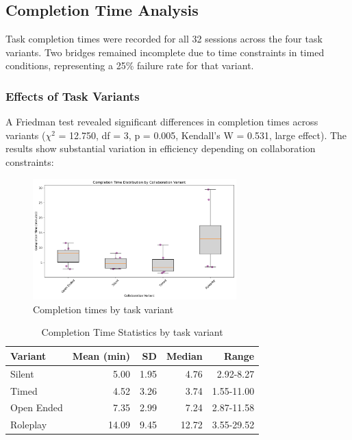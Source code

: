 \subsection{Completion Time Analysis}

Task completion times were recorded for all 32 sessions across the four task variants. Two bridges remained incomplete due to time constraints in timed conditions, representing a 25\% failure rate for that variant.

\subsubsection{Effects of Task Variants}

A Friedman test revealed significant differences in completion times across variants ($\chi^2$ = 12.750, df = 3, p = 0.005, Kendall's W = 0.531, large effect). The results show substantial variation in efficiency depending on collaboration constraints:

\begin{figure}[htbp]
\centering
\includegraphics[width=0.7\textwidth]{assets/06/completion_time_by_variant.pdf}
\caption{Completion times by task variant}
\label{fig:completion_times_main}
\end{figure}

\begin{table}[h]
\centering
\caption{Completion Time Statistics by task variant}
\label{tab:completion_time_stats}
\begin{tabular}{lrrrr}
\toprule
\textbf{Variant} & \textbf{Mean (min)} & \textbf{SD} & \textbf{Median} & \textbf{Range} \\
\midrule
Silent & 5.00 & 1.95 & 4.76 & 2.92-8.27 \\
Timed & 4.52 & 3.26 & 3.74 & 1.55-11.00 \\
Open Ended & 7.35 & 2.99 & 7.24 & 2.87-11.58 \\
Roleplay & 14.09 & 9.45 & 12.72 & 3.55-29.52 \\
\bottomrule
\end{tabular}
\end{table}

